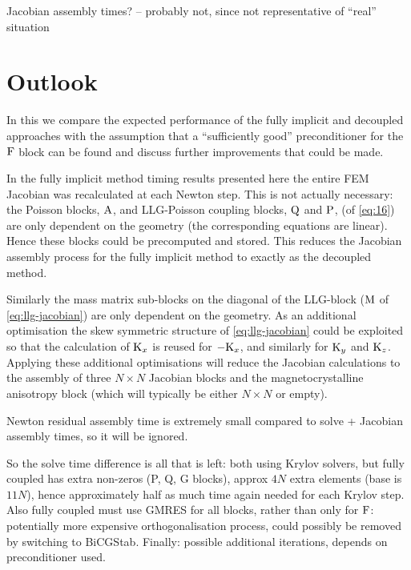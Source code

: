 Jacobian assembly times? -- probably not, since not representative of ``real'' situation



\section{Outlook}
\label{sec:furth-optim-opport}

In this  we compare the expected performance of the fully implicit and decoupled approaches with the assumption that a ``sufficiently good'' preconditioner for the $\mathrm{F}$ block can be found and discuss further improvements that could be made.

In the fully implicit method timing results presented here the entire FEM Jacobian was recalculated at each Newton step.
This is not actually necessary: the Poisson blocks, $\mathrm{A}$, and LLG-Poisson coupling blocks, $\mathrm{Q}$ and $\mathrm{P}$, (of \cref{eq:16}) are only dependent on the geometry (\ie the corresponding equations are linear).
Hence these blocks could be precomputed and stored.
This reduces the Jacobian assembly process for the fully implicit method to exactly as the decoupled method.

Similarly the mass matrix sub-blocks on the diagonal of the LLG-block ($\mathrm{M}$ of \cref{eq:llg-jacobian}) are only dependent on the geometry.
As an additional optimisation the skew symmetric structure of \cref{eq:llg-jacobian} could be exploited so that the calculation of $\mathrm{K}_x$ is reused for $-\mathrm{K}_x$, and similarly for $\mathrm{K}_y$ and $\mathrm{K}_z$.
Applying these additional optimisations will reduce the Jacobian calculations to the assembly of three $N \times N$ Jacobian blocks and the magnetocrystalline anisotropy block (which will typically be either $N \times N$ or empty).


Newton residual assembly time is extremely small compared to solve + Jacobian assembly times, so it will be ignored.

So the solve time difference is all that is left: both using Krylov solvers, but fully coupled has extra non-zeros (P, Q, G blocks), approx $4N$ extra elements (base is $11N$), hence approximately half as much time again needed for each Krylov step.
Also fully coupled must use GMRES for all blocks, rather than only for $\mathrm{F}$: potentially more expensive orthogonalisation process, could possibly be removed by switching to BiCGStab.
Finally: possible additional iterations, depends on preconditioner used.




